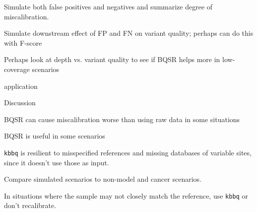\documentclass{article}
\begin{document}
\begin{outline}
\begin{outline}
\begin{figure}[h]
		\end{figure}	
		\item Simulate both false positives and negatives and summarize degree of miscalibration.
		\item Simulate downstream effect of FP and FN on variant quality; perhaps can do this with F-score
		\item Perhaps look at depth vs. variant quality to see if BQSR helps more in low-coverage scenarios
		\item application
	\end{outline}
	\item Discussion
	\begin{outline}
		\item BQSR can cause miscalibration worse than using raw data in some situations
		\item BQSR is useful in some scenarios
		\item \texttt{kbbq} is resilient to misspecified references and missing databases of variable sites, since it doesn't use those as input.
		\item Compare simulated scenarios to non-model and cancer scenarios.
		\begin{outline}
			\item In situations where the sample may not closely match the reference, use \texttt{kbbq} or don't recalibrate.
		\end{outline}
	\end{outline}
\end{outline}
\end{document}
